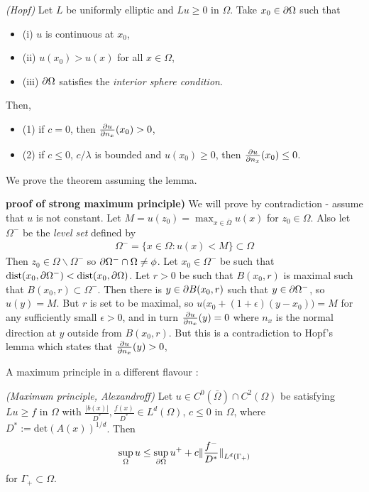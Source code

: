 \documentclass[12pt,a4paper]{article}
\newenvironment{proof}
{\begin{changemargin}{0.5cm}{0.5cm} 
	}%
	{\end{changemargin}
}
\renewenvironment{i}
{\begin{itemize} 
	}%
	{\end{itemize}
}
\newenvironment{p}
{\begin{proof} 
	}%
	{\end{proof}
}
\begin{document}
\lem \emph{(Hopf)} Let $L$ be uniformly elliptic and $Lu \geq 0$ in $\Omega$. Take $x_0 \in \partial\Omega$ such that
\begin{i}
\item[(i)] $u$ is continuous at $x_0$,
\item[(ii)] $u(x_0) > u(x)$ for all $x\in \Omega$,
\item[(iii)] $\partial \Omega$ satisfies the \emph{interior sphere condition}.
\end{i}
Then,
\begin{i}
\item[(1)] if $c=0$, then $\frac{\partial u}{\partial n_x} (x_0) >0$,
\item[(2)] if $c\leq 0$, $c/\lambda$ is bounded and $u(x_0) \geq 0$, then $\frac{\partial u}{\partial n_x}(x_0) \leq 0$.
\end{i}
\s

We prove the theorem assuming the lemma.
\s

\begin{p}
\textbf{proof of strong maximum principle)} We will prove by contradiction - assume that $u$ is not constant. Let $M = u(z_0) = \max_{x\in \bar{\Omega}}u(x)$ for $z_0 \in \Omega$. Also let $\Omega^-$ be the \emph{level set} defined by
\begin{align*}
\Omega^- = \{x\in \Omega : u(x) < M  \} \subset \Omega 
\end{align*}
Then $z_0 \in \Omega \backslash \Omega^-$ so $\partial \Omega^- \cap \Omega \neq \phi$. Let $x_0 \in \Omega^-$ be such that $\text{dist}(x_0, \partial \Omega^-) < \text{dist} (x_0, \partial \Omega)$. Let $r>0$ be such that $B(x_0, r)$ is maximal such that $B(x_0, r)\subset \Omega^-$. Then there is $y\in \partial B(x_0, r)$ such that $y\in \partial \Omega^-$, so $u(y) = M$. But $r$ is set to be maximal, so $u\big(x_0 + (1+\epsilon)(y-x_0)\big) =M$ for any sufficiently small $\epsilon >0$, and in turn $\frac{\partial u}{\partial n_x}(y) =0$ where $n_x$ is the normal direction at $y$ outside from $B(x_0, r)$. But this is a contradiction to Hopf's lemma which states that $\frac{\partial u}{\partial n_x}(y)>0$,

\eop
\end{p}
\s

A maximum principle in a different flavour :
\s

\thm \emph{(Maximum principle, Alexandroff)} Let $u \in C^0(\bar{\Omega}) \cap C^2(\Omega)$ be satisfying $Lu \geq f$ in $\Omega$ with $\frac{|b(x)|}{D^*}, \frac{f(x)}{D^*} \in L^d(\Omega)$, $c\leq  0$ in $\Omega$, where $D^* := \text{det}(A(x))^{1/d}$. Then
\begin{align*}
\sup_{\Omega} u \leq \sup_{\pa \Omega} u^+  + c \snorms{\frac{f^-}{D^*}}{L^d(\Gamma_+)}
\end{align*}
for $\Gamma_+ \subset \Omega$.
\s
\end{document}
